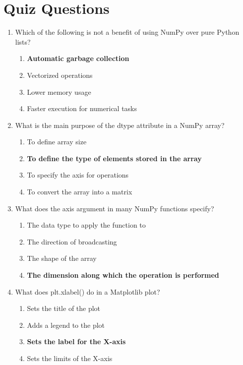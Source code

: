 \newpage

\section{Quiz Questions}

\begin{enumerate}
    \item Which of the following is not a benefit of using NumPy over pure
          Python lists?
    \begin{enumerate}
        \item \textbf{Automatic garbage collection}
        \item Vectorized operations
        \item Lower memory usage
        \item Faster execution for numerical tasks
    \end{enumerate}

    \item What is the main purpose of the dtype attribute in a NumPy array?
    \begin{enumerate}
        \item To define array size
        \item \textbf{To define the type of elements stored in the array}
        \item To specify the axis for operations
        \item To convert the array into a matrix
    \end{enumerate}

    \item What does the axis argument in many NumPy functions specify?
    \begin{enumerate}
        \item The data type to apply the function to
        \item The direction of broadcasting
        \item The shape of the array
        \item \textbf{The dimension along which the operation is performed}
    \end{enumerate}

    \item What does plt.xlabel() do in a Matplotlib plot?
    \begin{enumerate}
        \item Sets the title of the plot
        \item Adds a legend to the plot
        \item \textbf{Sets the label for the X-axis}
        \item Sets the limits of the X-axis
    \end{enumerate}


\end{enumerate}
